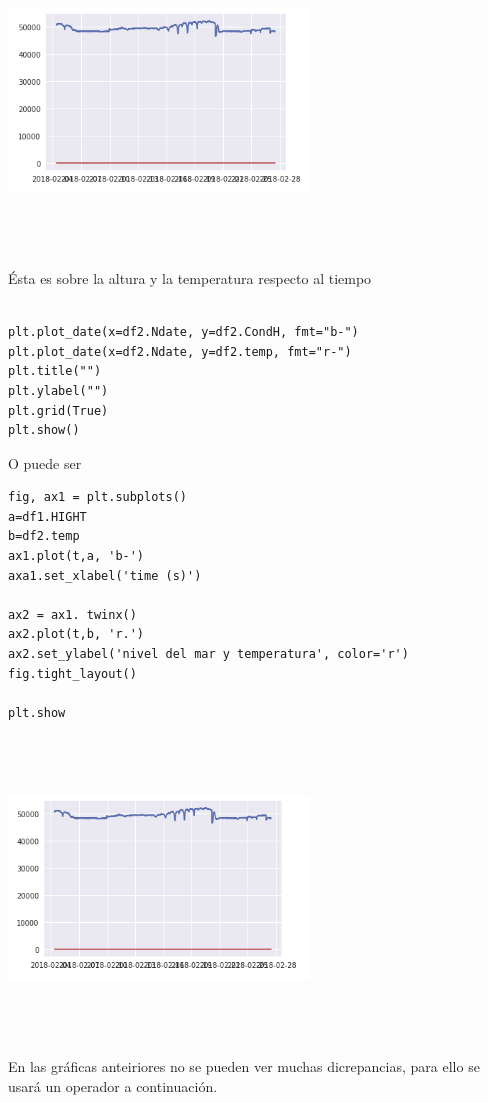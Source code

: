 \documentclass{article}
\begin{document}
\begin{center}

\includegraphics[width=8cm, height=8cm]{dos1.png}
\end{center}

Ésta es sobre la altura y la temperatura respecto al tiempo

\begin{verbatim}

plt.plot_date(x=df2.Ndate, y=df2.CondH, fmt="b-")
plt.plot_date(x=df2.Ndate, y=df2.temp, fmt="r-")
plt.title("")
plt.ylabel("")
plt.grid(True)
plt.show()

\end{verbatim}

O puede ser

\begin{verbatim}
fig, ax1 = plt.subplots()
a=df1.HIGHT
b=df2.temp
ax1.plot(t,a, 'b-')
axa1.set_xlabel('time (s)')

ax2 = ax1. twinx()
ax2.plot(t,b, 'r.')
ax2.set_ylabel('nivel del mar y temperatura', color='r')
fig.tight_layout()

plt.show
\end{verbatim}



\begin{center}

\includegraphics[width=8cm, height=8cm]{dos2.png}

\end{center}
En las gráficas anteiriores no se pueden ver muchas dicrepancias, para ello se usará un operador a continuación.
\end{document}
